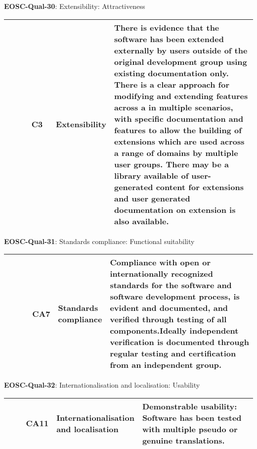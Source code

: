 \textbf{EOSC-Qual-30}: Extensibility: Attractiveness
\nopagebreak[4]
\begin{center}
    \tabletail{\hline}
    \tiny
    \begin{supertabular}{|p{0.10\linewidth}|p{0.10\linewidth}|p{0.20\linewidth}|p{0.60\linewidth}|} \hline
        \cite{shepherdson_cessda_2019} & C3 & Extensibility & There is evidence that the software has been extended externally by users outside of the original development group using existing documentation only. There is a clear approach for modifying and extending features across a in multiple scenarios, with specific documentation and features to allow the building of extensions which are used across a range of domains by multiple user groups. There may be a library available of user-generated content for extensions and user generated documentation on extension is also available.\\ \hline
    \end{supertabular}
\end{center}

\textbf{EOSC-Qual-31}: Standards compliance: Functional suitability
\nopagebreak[4]
\begin{center}
    \tabletail{\hline}
    \tiny
    \begin{supertabular}{|p{0.10\linewidth}|p{0.10\linewidth}|p{0.20\linewidth}|p{0.60\linewidth}|} \hline
        \cite{shepherdson_cessda_2019} & CA7 & Standards compliance & Compliance with open or internationally recognized standards for the software and software development process, is evident and documented, and verified through testing of all components.Ideally independent verification is documented through regular testing and certification from an independent group.\\ \hline
    \end{supertabular}
\end{center}

\textbf{EOSC-Qual-32}: Internationalisation and localisation: Usability
\nopagebreak[4]
\begin{center}
    \tabletail{\hline}
    \tiny
    \begin{supertabular}{|p{0.10\linewidth}|p{0.10\linewidth}|p{0.20\linewidth}|p{0.60\linewidth}|} \hline
        \cite{shepherdson_cessda_2019} & CA11 & Internationalisation and localisation & Demonstrable usability: Software has been tested with multiple pseudo or genuine translations.\\ \hline
    \end{supertabular}
\end{center}

